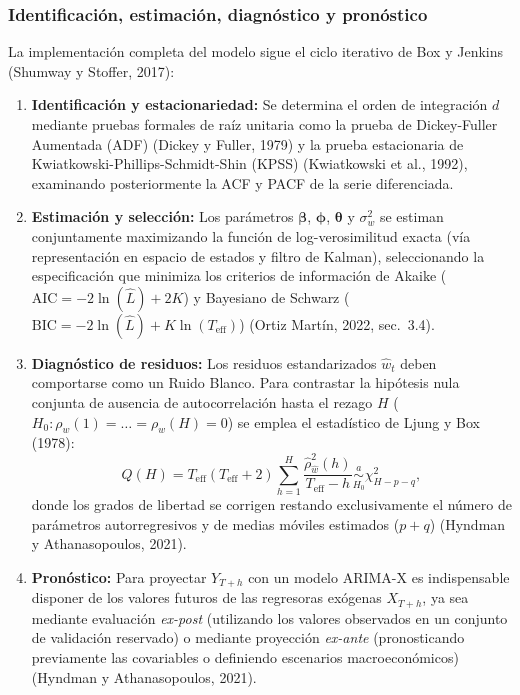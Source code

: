 \documentclass[11pt,letterpaper]{article}
\begin{document}
\subsubsection{Identificación, estimación, diagnóstico y pronóstico}
La implementación completa del modelo sigue el ciclo iterativo de Box y Jenkins (Shumway y Stoffer, 2017):
\begin{enumerate}
    \item \textbf{Identificación y estacionariedad:} Se determina el orden de integración $d$ mediante pruebas formales de raíz unitaria como la prueba de Dickey-Fuller Aumentada (ADF) (Dickey y Fuller, 1979) y la prueba estacionaria de Kwiatkowski-Phillips-Schmidt-Shin (KPSS) (Kwiatkowski et al., 1992), examinando posteriormente la ACF y PACF de la serie diferenciada.
    \item \textbf{Estimación y selección:} Los parámetros $\boldsymbol{\beta}$, $\boldsymbol{\phi}$, $\boldsymbol{\theta}$ y $\sigma_w^2$ se estiman conjuntamente maximizando la función de log-verosimilitud exacta (vía representación en espacio de estados y filtro de Kalman), seleccionando la especificación que minimiza los criterios de información de Akaike ($\text{AIC} = -2\ln(\hat{L}) + 2K$) y Bayesiano de Schwarz ($\text{BIC} = -2\ln(\hat{L}) + K\ln(T_{\text{eff}})$) (Ortiz Martín, 2022, sec.~3.4).
    \item \textbf{Diagnóstico de residuos:} Los residuos estandarizados $\hat{w}_t$ deben comportarse como un Ruido Blanco. Para contrastar la hipótesis nula conjunta de ausencia de autocorrelación hasta el rezago $H$ ($H_0: \rho_w(1) = \dots = \rho_w(H) = 0$) se emplea el estadístico de Ljung y Box (1978):
    \begin{equation}
    Q(H) = T_{\text{eff}}(T_{\text{eff}}+2)\sum_{h=1}^{H} \frac{\hat{\rho}_{\hat{w}}^2(h)}{T_{\text{eff}}-h} \underset{H_0}{\overset{a}{\sim}} \chi^2_{H - p - q} ,
    \label{eq:ljung_box}
    \end{equation}
    donde los grados de libertad se corrigen restando exclusivamente el número de parámetros autorregresivos y de medias móviles estimados ($p + q$) (Hyndman y Athanasopoulos, 2021).
    \item \textbf{Pronóstico:} Para proyectar $Y_{T+h}$ con un modelo ARIMA-X es indispensable disponer de los valores futuros de las regresoras exógenas $X_{T+h}$, ya sea mediante evaluación \textit{ex-post} (utilizando los valores observados en un conjunto de validación reservado) o mediante proyección \textit{ex-ante} (pronosticando previamente las covariables o definiendo escenarios macroeconómicos) (Hyndman y Athanasopoulos, 2021).
\end{enumerate}
\end{document}
